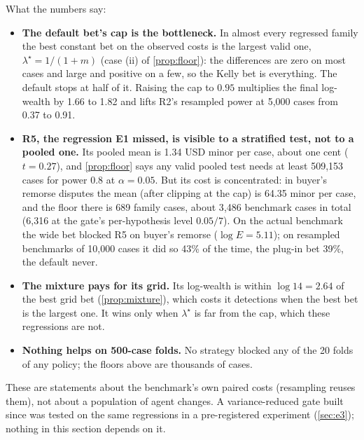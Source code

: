 What the numbers say:
\begin{itemize}
\item \textbf{The default bet's cap is the bottleneck.} In almost every regressed family the best constant bet on the observed costs is the largest valid one, $\lambda^\star=1/(1+m)$ (case (ii) of \cref{prop:floor}): the differences are zero on most cases and large and positive on a few, so the Kelly bet is everything. The default stops at half of it. Raising the cap to $0.95$ multiplies the final log-wealth by 1.66 to 1.82 and lifts R2's resampled power at 5{,}000 cases from 0.37 to 0.91.
\item \textbf{R5, the regression E1 missed, is visible to a stratified test, not to a pooled one.} Its pooled mean is 1.34 USD minor per case, about one cent ($t=0.27$), and \cref{prop:floor} says any valid pooled test needs at least 509{,}153 cases for power 0.8 at $\alpha=0.05$. But its cost is concentrated: in buyer's remorse disputes the mean (after clipping at the cap) is 64.35 minor per case, and the floor there is 689 family cases, about 3{,}486 benchmark cases in total (6{,}316 at the gate's per-hypothesis level $0.05/7$). On the actual benchmark the wide bet blocked R5 on buyer's remorse ($\log E=5.11$); on resampled benchmarks of 10{,}000 cases it did so 43\% of the time, the plug-in bet 39\%, the default never.
\item \textbf{The mixture pays for its grid.} Its log-wealth is within $\log14=2.64$ of the best grid bet (\cref{prop:mixture}), which costs it detections when the best bet is the largest one. It wins only when $\lambda^\star$ is far from the cap, which these regressions are not.
\item \textbf{Nothing helps on 500-case folds.} No strategy blocked any of the 20 folds of any policy; the floors above are thousands of cases.
\end{itemize}
These are statements about the benchmark's own paired costs (resampling reuses them), not about a population of agent changes. A variance-reduced gate built since was tested on the same regressions in a pre-registered experiment (\cref{sec:e3}); nothing in this section depends on it.
